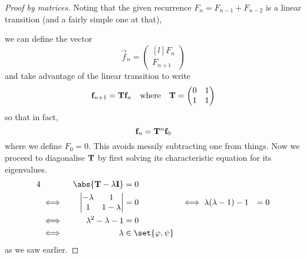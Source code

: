 \begin{proof}[Proof by matrices]
    Noting that the given recurrence \(F_n = F_{n - 1} + F_{n - 2}\) is a linear
    transition (and a fairly simple one at that),

    we can define the vector
    \begin{equation*}
        \vec f_n =
        \begin{pmatrix*}[l]
            F_n \\
            F_{n + 1}
        \end{pmatrix*}
    \end{equation*}
    and take advantage of the linear transition to write
    \begin{equation*}
        \mathrm{\mathbf{f}}_{n + 1} = \mathbf{T} \mathrm{\mathbf{f}}_n \quad \text{where} \quad
        \mathbf{T} =
        \begin{pmatrix}
            0 & 1 \\
            1 & 1
        \end{pmatrix}
    \end{equation*}
    so that in fact,
    \begin{equation*}
        \mathrm{\mathbf{f}}_n = \mathbf{T}^n\mathrm{\mathbf{f}}_0
    \end{equation*}
    where we define \(F_0 = 0\). This avoids messily subtracting one from
    things. Now we proceed to diagonalise \(\mathbf{T}\) by first solving its
    characteristic equation for its eigenvalues.
    \begin{alignat*}4
        && \abs{\mat T - \lambda \mat I} &= 0 \\
        &\iff{}&
            \begin{vmatrix}
                -\lambda & 1 \\
                1 & 1 - \lambda
            \end{vmatrix} &= 0
        &\iff{}& \lambda (\lambda - 1) - 1 &= 0 \\
        &\iff{}& \lambda^2 - \lambda - 1 &= 0 \\
        &\iff{}& \lambda &\in \set{\varphi, \psi}
    \end{alignat*}
    as we saw earlier.


\end{proof}
